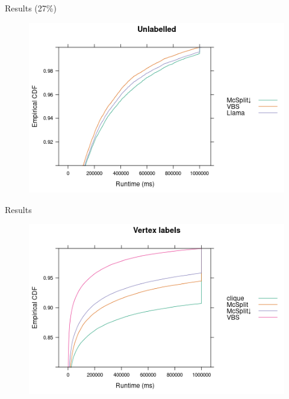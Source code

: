 \documentclass{beamer}
\begin{document}
\begin{frame}{Results (27\%)}
  \begin{figure}
    \centering
    \includegraphics[width=\textwidth]{../dissertation/images/ecdf_unlabelled_llama.png}
  \end{figure}
\end{frame}

\begin{frame}{Results}
  \begin{figure}
    \centering
    \includegraphics[width=\textwidth]{../dissertation/images/ecdf_vertex_labels.png}
  \end{figure}
\end{frame}
\end{document}
